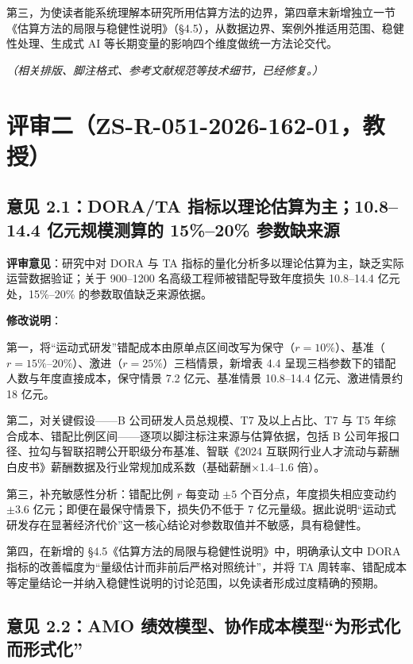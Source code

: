 \documentclass[11pt,a4paper]{ctexart}
\begin{document}
第三，为使读者能系统理解本研究所用估算方法的边界，第四章末新增独立一节《估算方法的局限与稳健性说明》（§4.5），从数据边界、案例外推适用范围、稳健性处理、生成式 AI 等长期变量的影响四个维度做统一方法论交代。

\vspace{0.3em}
\noindent\emph{（相关排版、脚注格式、参考文献规范等技术细节，已经修复。）}

\section{评审二（ZS-R-051-2026-162-01，教授）}

\subsection{意见 2.1：DORA/TA 指标以理论估算为主；10.8--14.4 亿元规模测算的 15\%--20\% 参数缺来源}

\noindent\textbf{评审意见}：研究中对 DORA 与 TA 指标的量化分析多以理论估算为主，缺乏实际运营数据验证；关于 900--1200 名高级工程师被错配导致年度损失 10.8--14.4 亿元处，15\%--20\% 的参数取值缺乏来源依据。

\vspace{0.3em}
\noindent\textbf{修改说明}：

第一，将“运动式研发”错配成本由原单点区间改写为保守（$r=10\%$）、基准（$r=15\%$--$20\%$）、激进（$r=25\%$）三档情景，新增表 4.4 呈现三档参数下的错配人数与年度直接成本，保守情景 7.2 亿元、基准情景 10.8--14.4 亿元、激进情景约 18 亿元。

第二，对关键假设——B 公司研发人员总规模、T7 及以上占比、T7 与 T5 年综合成本、错配比例区间——逐项以脚注标注来源与估算依据，包括 B 公司年报口径、拉勾与智联招聘公开职级分布基准、智联《2024 互联网行业人才流动与薪酬白皮书》薪酬数据及行业常规加成系数（基础薪酬×1.4--1.6 倍）。

第三，补充敏感性分析：错配比例 $r$ 每变动 $\pm 5$ 个百分点，年度损失相应变动约 $\pm 3.6$ 亿元；即便在最保守情景下，损失仍不低于 7 亿元量级。据此说明“运动式研发存在显著经济代价”这一核心结论对参数取值并不敏感，具有稳健性。

第四，在新增的 §4.5《估算方法的局限与稳健性说明》中，明确承认文中 DORA 指标的改善幅度为“量级估计而非前后严格对照统计”，并将 TA 周转率、错配成本等定量结论一并纳入稳健性说明的讨论范围，以免读者形成过度精确的预期。

\subsection{意见 2.2：AMO 绩效模型、协作成本模型“为形式化而形式化”}
\end{document}
